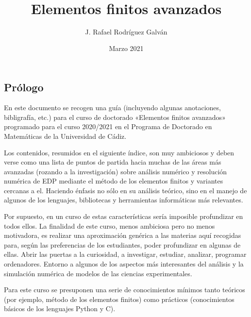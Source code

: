 \documentclass[11pt]{article}
\title{Elementos finitos avanzados}
\author{J. Rafael Rodríguez Galván}
\date{Marzo 2021}
\begin{document}
\maketitle
\tableofcontents

\subsection*{Prólogo}
En este documento se recogen una guía (incluyendo algunas anotaciones,
bibligrafía, etc.) para el curso de doctorado «Elementos finitos
avanzados» programado para el curso 2020/2021 en el Programa de
Doctorado en Matemáticas de la Universidad de Cádiz.

Los contenidos, resumidos en el siguiente índice, son muy ambiciosos y
deben verse como una lista de puntos de partida hacia muchas de las
áreas más avanzadas (rozando a la investigación) sobre análisis
numérico y resolución numérica de EDP mediante el método de los
elementos finitos y variantes cercanas a el. Haciendo énfasis no sólo
en su análisis teórico, sino en el manejo de algunos de los lenguajes,
bibliotecas y herramientas informáticas más relevantes.

Por supuesto, en un curso de estas características sería imposible
profundizar en todos ellos. La finalidad de este curso, menos
ambiciosa pero no menos motivadora, es realizar una aproximación
genérica a las materias aquí recogidas para, según las preferencias de
los estudiantes, poder profundizar en algunas de ellas.  Abrir las
puertas a la curiosidad, a investigar, estudiar, analizar, programar
ordenadores. Entorno a algunos de los aspectos más interesantes del
análisis y la simulación numérica de modelos de las ciencias experimentales.

Para este curso se presuponen una serie de conocimientos mínimos tanto
teóricos (por ejemplo, método de los elementos finitos) como prácticos
(conocimientos básicos de los lenguajes Python y C).
















\end{document}
